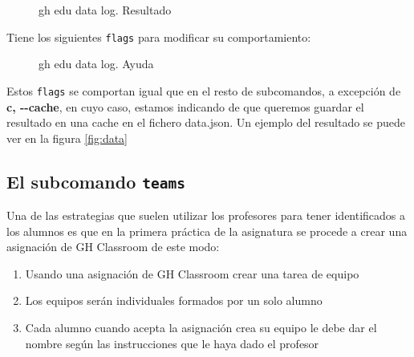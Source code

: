 \begin{figure}[H]
    \centering
    \caption{gh edu data log. Resultado}
    \label{fig:result-log}
\end{figure}

Tiene los siguientes \verb|flags| para modificar su comportamiento:
\begin{figure}[H]
    \centering
    \caption{gh edu data log. Ayuda}
    \label{fig:data-log-help}
\end{figure}

Estos \verb|flags| se comportan igual que en el resto de subcomandos, a excepción de \textbf{c, -{}-cache}, en cuyo caso, estamos indicando de que queremos guardar el resultado en una \gls{cache} en el fichero data.json. Un ejemplo del resultado se puede ver en la figura \ref{fig:data}

\subsection{El subcomando {\tt teams}}
Una de las estrategias que suelen utilizar los profesores para tener identificados a los alumnos es que en la primera práctica de la asignatura se procede a crear una asignación de GH Classroom de este modo:
\begin{enumerate}
    \item Usando una asignación de GH Classroom crear una tarea de equipo
    \item Los equipos serán individuales formados por un solo alumno
    \item Cada alumno cuando acepta la asignación crea su equipo le debe dar el nombre según las instrucciones que le haya dado el profesor
\end{enumerate}

